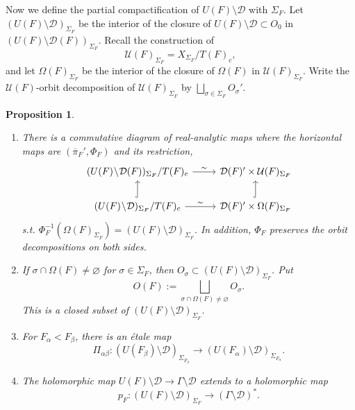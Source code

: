 \documentclass[11pt,english]{smfart}
\newtheorem{proposition}{Proposition}[section]
\theoremstyle{definition}
\theoremstyle{remark}
\newcommand{\under}{\!\setminus\!}
\renewcommand{\bar}{\overline}
\begin{document}
Now we define the partial compactification of $U(F)\under\mathcal{D} $ with $\Sigma_F$.
Let $(U(F)\under\mathcal{D})_{\Sigma_F}$ be the interior of the closure of $U(F)\under\mathcal{D}\subset O_0$ in $(U(F)\under\mathcal{D}(F))_{\Sigma_F}$.
Recall the construction of \[\mathcal{U}(F)_{\Sigma_F} = X_{\Sigma_F}/T(F)_c,\] and let $\Omega(F)_{\Sigma_F}$ be the interior of the closure of $\Omega(F)$ in $\mathcal{U}(F)_{\Sigma_F}$.
Write the $\mathcal{U}(F)$-orbit decomposition of $\mathcal{U}(F)_{\Sigma_F}$ by $\bigsqcup_{\sigma\in\Sigma_F} O_\sigma'$.
\begin{proposition}\begin{enumerate}
    \item [(1)]
    There is a commutative diagram of real-analytic maps where the horizontal maps are $(\bar{\pi}_F', \Phi_F)$ and its restriction,
    \[
    \begin{tikzcd}
    (U(F)\under\mathcal{D}(F))_{\Sigma_F}/T(F)_c \arrow[r, "\sim"]              & \mathcal{D}(F)'\times\mathcal{U}(F)_{\Sigma_F}            \\
    (U(F)\under\mathcal{D})_{\Sigma_F}/T(F)_c \arrow[r, "\sim"] \arrow[u, hook] & \mathcal{D}(F)'\times\Omega(F)_{\Sigma_F} \arrow[u, hook]
    \end{tikzcd}\]
    s.t. $\Phi_F^{-1}(\Omega(F)_{\Sigma_F}) = (U(F)\under\mathcal{D})_{\Sigma_F}$.
    In addition, $\Phi_F$ preserves the orbit decompositions on both sides.
    \item [(2)] If $\sigma\cap\Omega(F)\neq\varnothing$ for $\sigma\in\Sigma_F$, then $O_\sigma\subset (U(F)\under\mathcal{D})_{\Sigma_F}$.
    Put \[O(F) := \bigsqcup_{\sigma\cap\Omega(F)\neq\varnothing} O_\sigma.\] This is a closed subset of $(U(F)\under\mathcal{D})_{\Sigma_F}$.
    \item [(3)] For $F_\alpha < F_\beta$, there is an \'etale map \[\Pi_{\alpha\beta}: (U(F_\beta)\under\mathcal{D})_{\Sigma_{F_\beta}}\to (U(F_\alpha)\under\mathcal{D})_{\Sigma_{F_\alpha}}.\]
    \item [(4)] The holomorphic map $U(F)\under\mathcal{D}\to\Gamma\under\mathcal{D}$ extends to a holomorphic map\[p_F:(U(F)\under\mathcal{D})_{\Sigma_F}\to (\Gamma\under\mathcal{D})^*.\]
\end{enumerate}

\end{proposition}

\end{document}
